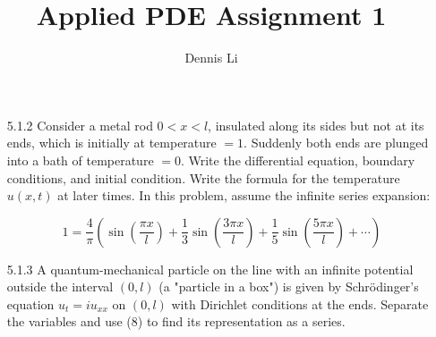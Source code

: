 \documentclass[12pt]{article}
\title{\textbf{Applied PDE Assignment 1}}
\author{Dennis Li}
\begin{document}
\maketitle


\begin{enumerate}
    \item[5.1.2] Consider a metal rod \( 0 < x < l \), insulated along its sides but not at its ends, which is initially at temperature \( = 1 \). Suddenly both ends are plunged into a bath of temperature \( = 0 \). Write the differential equation, boundary conditions, and initial condition. Write the formula for the temperature \( u(x, t) \) at later times. In this problem, assume the infinite series expansion:
    
    \[
    1 = \frac{4}{\pi} \left( \sin\left( \frac{\pi x}{l} \right) + \frac{1}{3} \sin\left( \frac{3 \pi x}{l} \right) + \frac{1}{5} \sin\left( \frac{5 \pi x}{l} \right) + \cdots \right)
    \]

    \item[5.1.3] A quantum-mechanical particle on the line with an infinite potential outside the interval \( (0, l) \) (a "particle in a box") is given by Schrödinger's equation \( u_t = i u_{xx} \) on \( (0, l) \) with Dirichlet conditions at the ends. Separate the variables and use (8) to find its representation as a series.






    
\end{enumerate}
\end{document}
